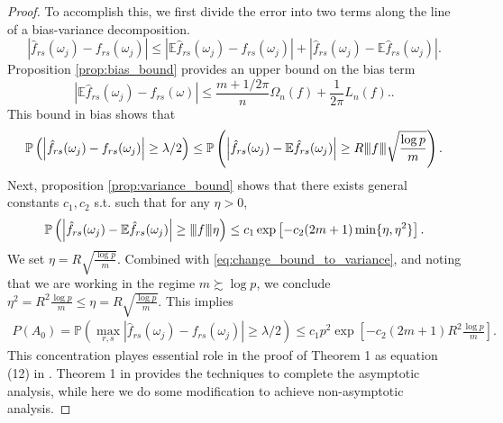 \begin{proof}
To accomplish this, we first divide the error into two terms along the line of a bias-variance decomposition.
\begin{equation}
\left|\hat{f}_{rs}(\omega_j) - f_{rs}(\omega_j)\right| \le \left|\mathbb{E}\hat{f}_{rs}(\omega_j) - f_{rs}(\omega_j)\right| + \left| \hat{f}_{rs}(\omega_j) - \mathbb{E}\hat{f}_{rs}(\omega_j) \right|. \nonumber
\end{equation}
Proposition \ref{prop:bias_bound} provides an upper bound on the bias term %
\begin{equation}
\left|\mathbb{E}\hat{f}_{rs}(\omega_j) - f_{rs}(\omega)\right| \le \frac{m+1/2\pi}{n}\Omega_n(f) + \frac{1}{2\pi}L_n(f).. \nonumber
\end{equation}
This bound in bias shows that 
\begin{equation}
\label{eq:change_bound_to_variance}
    \mathbb{P}\left(\left|\hat{f}_{rs}(\omega_j)-f_{rs}(\omega_j)\right|\ge \lambda/2\right)\le 
    \mathbb{P}\left(\left|\hat{f}_{rs}(\omega_j)-\mathbb{E}\hat{f}_{rs}(\omega_j)\right|\ge R{\left\vert\kern-0.25ex\left\vert\kern-0.25ex\left\vert f \right\vert\kern-0.25ex\right\vert\kern-0.25ex\right\vert}\sqrt{\frac{\log p}{m}}\right).
\end{equation}
Next, proposition \ref{prop:variance_bound} shows that there exists general constants $c_1, c_2$ s.t. 
such that for any $\eta > 0$, 
\begin{equation}
\mathbb{P}\left(\left|\hat{f}_{rs}(\omega_j) - \mathbb{E}\hat{f}_{rs}(\omega_j)\right| \ge {\left\vert\kern-0.25ex\left\vert\kern-0.25ex\left\vert f \right\vert\kern-0.25ex\right\vert\kern-0.25ex\right\vert}\eta\right)\le c_1\exp\left[-c_2(2m+1)\min\{\eta, \eta^2\}\right]. \nonumber 
\end{equation}
We set $\eta = R\sqrt{\frac{\log p}{m}}$. Combined with   \eqref{eq:change_bound_to_variance}, and noting that we are working in the  regime $m\succsim \log p$, we conclude  $\eta^2 = R^2\frac{\log p}{m} \le \eta = R\sqrt{\frac{\log p}{m}}$. This implies 
\begin{equation}
\begin{aligned}
P({A}_0) = \mathbb{P}(\max_{r, s}|\hat{f}_{rs}(\omega_j)-f_{rs}(\omega_j)|\ge \lambda/2) \le c_1 p^2\exp\left[-c_2 (2m+1)R^2\frac{\log p}{m}\right]. \nonumber
 \end{aligned}
\end{equation}
This concentration playes essential role in the proof of Theorem 1 as equation (12) in \citet{bickel2008covariance}. Theorem 1 in \cite{bickel2008covariance} provides the techniques to complete the asymptotic analysis, while here we do some modification to achieve non-asymptotic analysis. \par 
\smallskip 

\end{proof}
